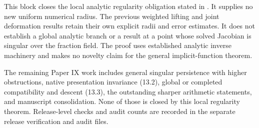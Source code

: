 This block closes the local analytic regularity obligation stated in
. It supplies no new uniform numerical
radius. The previous weighted lifting and joint deformation results
retain their own explicit radii and error estimates. It does not
establish a global analytic branch or a result at a point whose solved
Jacobian is singular over the fraction field. The proof uses established
analytic inverse machinery and makes no novelty claim for the general
implicit-function theorem.

The remaining Paper IX work includes general singular persistence with
higher obstructions, native presentation invariance (13.2), global or
completed compatibility and descent (13.3), the outstanding sharper
arithmetic statements, and manuscript consolidation. None of those is
closed by this local regularity theorem. Release-level checks and audit
counts are recorded in the separate release verification and audit
files.
